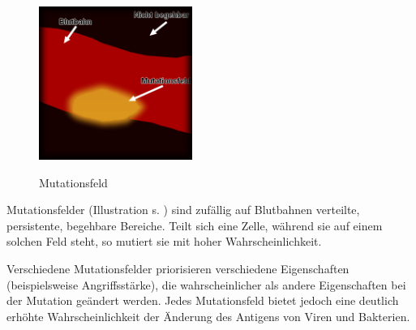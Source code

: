 
\begin{figure}
  \begin{center}
    \includegraphics[width=5cm]{./img_objekte/mutationsfeld.png}\\
  \end{center}

  \caption{Mutationsfeld}
  \label{fig:mutationsfeld}
\end{figure}

Mutationsfelder (Illustration s. ) sind zufällig
auf Blutbahnen verteilte, persistente, begehbare Bereiche. Teilt sich eine Zelle,
während sie auf einem solchen Feld steht, so mutiert sie mit hoher
Wahrscheinlichkeit.

Verschiedene Mutationsfelder priorisieren verschiedene Eigenschaften
(beispielsweise Angriffsstärke), die wahrscheinlicher als andere Eigenschaften
bei der Mutation geändert werden. Jedes Mutationsfeld bietet jedoch eine
deutlich erhöhte Wahrscheinlichkeit der Änderung des Antigens von Viren
und Bakterien.

